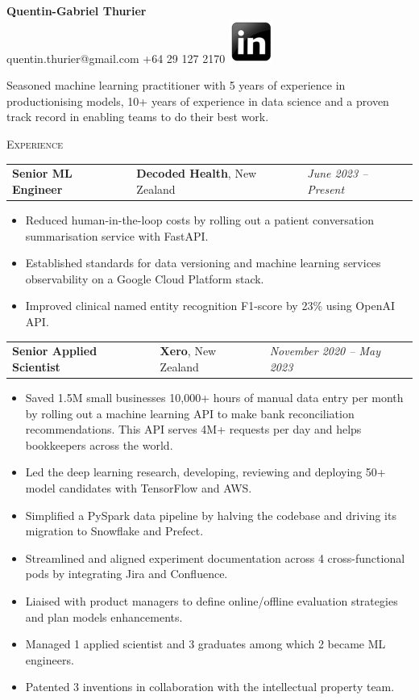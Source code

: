 \documentclass[letterpaper,11pt]{article}
\renewcommand{\section}[1]{{\vspace{0.3cm}}{\scshape\color{blue}#1}{\color{blue}\hrulefill}{\vspace{0.2cm}}}
\newcommand{\resumeItemListStart}{\begin{itemize}[label=$\circ$, topsep=0.1cm, parsep=0cm, partopsep=0cm, itemsep=0.1cm, leftmargin=0.4cm]}
\newcommand{\resumeItem}[1]{\item\small{#1}}
\newcommand{\resumeJustifiedItem}[1]{\item\begin{justify}\small{#1}\end{justify}}
\newcommand{\resumeItemListEnd}{\end{itemize}}
\newcommand{\job}[4]{
    \begin{tabular}{p{7cm}p{6cm}p{5cm}}
      \hspace{-0.7em} \textbf{#1} & \textbf{\small{#2}}\scriptsize{, #3} & \hfill \textit{\small{#4}}
    \end{tabular}
}
\begin{document}
 

\begin{center}
  \textbf{\Large Quentin-Gabriel Thurier} \\
  \small{quentin.thurier@gmail.com} \textbar{}
  \small{+64 29 127 2170} \textbar{}
  \href{https://www.linkedin.com/in/quentin-gabriel-thurier-36586021/}{\includegraphics[scale=0.6,valign=b]{linkedin}} %
\end{center}

\begin{justify}
  Seasoned machine learning practitioner with 5 years of experience in productionising models, 10+ years of experience in data science and a proven track record in enabling teams to do their best work.
\end{justify}

\vspace{-0.2cm}

\section{Experience}

\job {Senior ML Engineer}{Decoded Health}{New Zealand}{June 2023 -- Present}
\resumeItemListStart
\resumeItem {Reduced human-in-the-loop costs by rolling out a patient conversation summarisation service with FastAPI.}
\resumeItem {Established standards for data versioning and machine learning services observability on a Google Cloud Platform stack.}
\resumeItem {Improved clinical named entity recognition F1-score by 23\% using OpenAI API.}
\resumeItemListEnd \vspace{0.2cm}

\job {Senior Applied Scientist}{Xero}{New Zealand}{November 2020 -- May 2023}
\resumeItemListStart
\resumeJustifiedItem {Saved 1.5M small businesses 10,000+ hours of manual data entry per month by rolling out a machine learning API to make bank reconciliation recommendations. This API serves 4M+ requests per day and helps bookkeepers across the world.}
\resumeJustifiedItem {Led the deep learning research, developing, reviewing and deploying 50+ model candidates with TensorFlow and AWS.}
\resumeItem {Simplified a PySpark data pipeline by halving the codebase and driving its migration to Snowflake and Prefect.}
\resumeItem {Streamlined and aligned experiment documentation across 4 cross-functional pods by integrating Jira and Confluence.}
\resumeItem {Liaised with product managers to define online/offline evaluation strategies and plan models enhancements.}
\resumeItem {Managed 1 applied scientist and 3 graduates among which 2 became ML engineers.}
\resumeItem {Patented 3 inventions in collaboration with the intellectual property team.}
\resumeItemListEnd \vspace{0.2cm}
\end{document}
